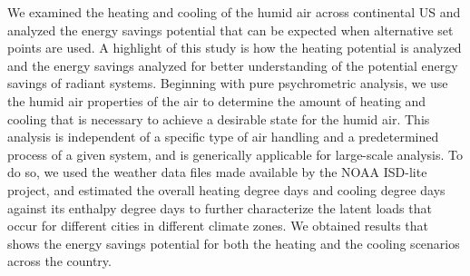We examined the heating and cooling of the humid air across continental US and analyzed the energy savings potential that can be expected when alternative set points are used. A highlight of this study is how the heating potential is analyzed and the energy savings analyzed for better understanding of the potential energy savings of radiant systems. Beginning with pure psychrometric analysis, we use the humid air properties of the air to determine the amount of heating and cooling that is necessary to achieve a desirable state for the humid air. This analysis is independent of a specific type of air handling and a predetermined process of a given system, and is generically applicable for large-scale analysis. To do so, we used the weather data files made available by the NOAA ISD-lite project, and estimated the overall heating degree days and cooling degree days against its enthalpy degree days to further characterize the latent loads that occur for different cities in different climate zones. We obtained results that shows the energy savings potential for both the heating and the cooling scenarios across the country.